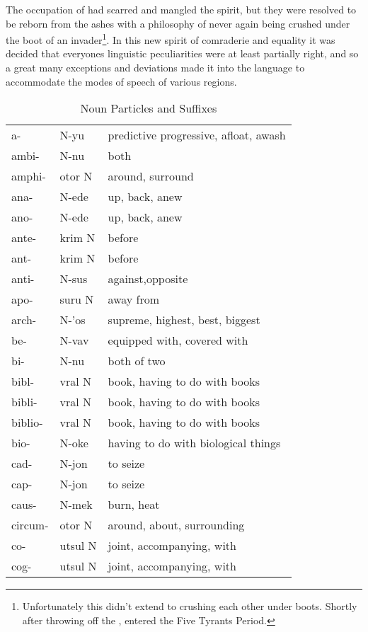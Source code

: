The  occupation of  had scarred and mangled the \klingon spirit, but they were resolved to be reborn from the ashes with a philosophy of never again being crushed under the boot of an invader\footnote{Unfortunately this didn't extend to crushing each other under \klingon boots. Shortly after throwing off the , \klingons entered the Five Tyrants Period.}. In this new spirit of comraderie and equality it was decided that everyones linguistic peculiarities were at least partially right, and so a great many exceptions and deviations made it into the language to accommodate the modes of speech of various regions.

\begin{table}[ht]
	\caption{Noun Particles and Suffixes}
	\centering
	\begin{tabular}{ l l l }
		\toprule
		a- & N-yu & predictive progressive, afloat, awash \\
		ambi- & N-nu & both \\
		amphi- & otor N & around, surround \\
		ana- & N-ede & up, back, anew \\
		ano- & N-ede & up, back, anew \\
		ante- & krim N & before \\
		ant- & krim N & before \\
		anti- & N-sus & against,opposite \\
		apo- & suru N & away from \\
		arch- & N-'os & supreme, highest, best, biggest \\
		be- & N-vav & equipped with, covered with \\
		bi- & N-nu & both of two \\
		bibl- & vral N & book, having to do with books \\
		bibli- & vral N & book, having to do with books \\
		biblio- & vral N & book, having to do with books \\
		bio- & N-oke & having to do with biological things \\
		cad- & N-jon & to seize \\
		cap- & N-jon & to seize \\
		caus- & N-mek & burn, heat \\
		circum- & otor N & around, about, surrounding \\
		co- & utsul N & joint, accompanying, with \\
		cog- & utsul N & joint, accompanying, with \\

\end{tabular}
\end{table}
